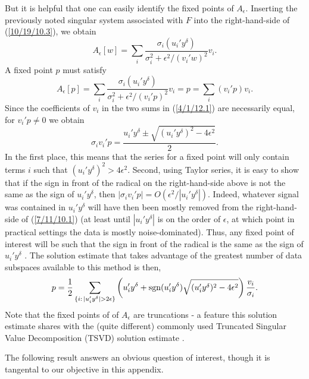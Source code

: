\documentclass{amsart}
\numberwithin{equation}{section}
\theoremstyle{definition}
\numberwithin{theorem}{section}
\begin{document}
{ 
But it is helpful that one can easily identify the fixed points of $A_\epsilon$. Inserting the previously noted
singular system associated with $F$ into the right-hand-side of (\ref{10/19/10.3}),  we obtain \begin{equation}\label{3/31/12.3} A_\epsilon[w] = \sum_i \frac{\sigma_i (u_i'y^\delta)}{\sigma_i^2 + \epsilon^2/(v_i'w)^2}v_i .\end{equation} A fixed point $p$ must satisfy  \begin{equation}\label{4/1/12.1} A_\epsilon[p] = \sum_i  \frac{\sigma_i (u_i'y^\delta)}{\sigma_i^2 + \epsilon^2/(v_i'p)^2}v_i = p = \sum_i  (v_i' p)v_i.\end{equation}  Since the coefficients of $v_i$ in the two sums in (\ref{4/1/12.1}) are necessarily equal, for $v_i'p\ne 0$ we obtain \begin{equation}\label{7/11/10.1} \sigma_iv_i'p = \frac{u_i' y^\delta \pm \sqrt{(u_i'y^\delta)^2 -4\epsilon^2}}{2}.\end{equation}  In the first place, this means that the series for a fixed point will only contain terms $i$ such that $(u_i'y^\delta)^2 >4\epsilon^2$.  Second, using Taylor series, it is easy to show that if the sign in front of the radical on the right-hand-side above is not the same as the sign of $u_i'y^\delta$, then $|\sigma_i v_i'p| =  O(\epsilon^2/|u_i'y^\delta|)$.  Indeed, whatever signal
 was contained in $u_i'y^\delta$ will have then been mostly 
 removed from the right-hand-side of (\ref{7/11/10.1}) (at least until $|u_i'y^\delta|$ is on the order of $\epsilon$, at which point in practical settings the data is mostly noise-dominated).   Thus, any fixed point of interest will be such that the sign in front of the radical is the same as the sign of $u_i'y^\delta$ .   The solution estimate that takes advantage of the greatest number of data subspaces available to this method is then,
\begin{equation}\label{7/19/10.1} p = \frac{1}{2}\sum_{\{i:\,|u_i'y^\delta|>2\epsilon\}} \left(u_i' y^\delta + {\rm sgn}(u_i' y^\delta) \sqrt{(u_i'y^\delta)^2 -4\epsilon^2}\right)\frac{v_i}{\sigma_i}.\end{equation}      
Note that the fixed points of of $A_\epsilon$ are truncations - a feature this solution estimate shares with the (quite different)  commonly used Truncated Singular Value Decomposition (TSVD) solution estimate \cite{vogel:2002}.  

The following result answers an obvious question of interest, though it is tangental to our objective in this appendix.



}
\end{document}
